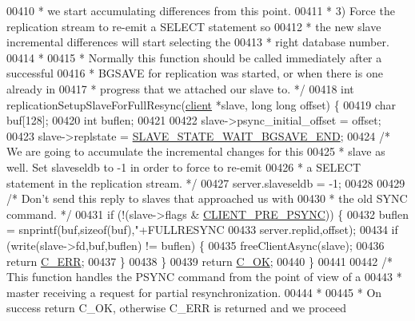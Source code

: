 \begin{DoxyCode}
{{{{{{{{{{{{{{{{{{{00410 \textcolor{comment}{ *    we start accumulating differences from this point.}
00411 \textcolor{comment}{ * 3) Force the replication stream to re-emit a SELECT statement so}
00412 \textcolor{comment}{ *    the new slave incremental differences will start selecting the}
00413 \textcolor{comment}{ *    right database number.}
00414 \textcolor{comment}{ *}
00415 \textcolor{comment}{ * Normally this function should be called immediately after a successful}
00416 \textcolor{comment}{ * BGSAVE for replication was started, or when there is one already in}
00417 \textcolor{comment}{ * progress that we attached our slave to. */}
00418 \textcolor{keywordtype}{int} replicationSetupSlaveForFullResync(\hyperlink{structclient}{client} *slave, \textcolor{keywordtype}{long} \textcolor{keywordtype}{long} offset) \{
00419     \textcolor{keywordtype}{char} buf[128];
00420     \textcolor{keywordtype}{int} buflen;
00421 
00422     slave->psync\_initial\_offset = offset;
00423     slave->replstate = \hyperlink{server_8h_a2a1b586e8f326f831f6ab466c8c3f38a}{SLAVE\_STATE\_WAIT\_BGSAVE\_END};
00424     \textcolor{comment}{/* We are going to accumulate the incremental changes for this}
00425 \textcolor{comment}{     * slave as well. Set slaveseldb to -1 in order to force to re-emit}
00426 \textcolor{comment}{     * a SELECT statement in the replication stream. */}
00427     server.slaveseldb = -1;
00428 
00429     \textcolor{comment}{/* Don't send this reply to slaves that approached us with}
00430 \textcolor{comment}{     * the old SYNC command. */}
00431     \textcolor{keywordflow}{if} (!(slave->flags & \hyperlink{server_8h_ac13d62411270bd658f6d82e711e0f912}{CLIENT\_PRE\_PSYNC})) \{
00432         buflen = snprintf(buf,\textcolor{keyword}{sizeof}(buf),\textcolor{stringliteral}{"+FULLRESYNC %
00433                           server.replid,offset);
00434         \textcolor{keywordflow}{if} (write(slave->fd,buf,buflen) != buflen) \{
00435             freeClientAsync(slave);
00436             \textcolor{keywordflow}{return} \hyperlink{server_8h_af98ac28d5f4d23d7ed5985188e6fb7d1}{C\_ERR};
00437         \}
00438     \}
00439     \textcolor{keywordflow}{return} \hyperlink{server_8h_a303769ef1065076e68731584e758d3e1}{C\_OK};
00440 \}
00441 
00442 \textcolor{comment}{/* This function handles the PSYNC command from the point of view of a}
00443 \textcolor{comment}{ * master receiving a request for partial resynchronization.}
00444 \textcolor{comment}{ *}
00445 \textcolor{comment}{ * On success return C\_OK, otherwise C\_ERR is returned and we proceed}
}}}}}}}}}}}}}}}}}}}}
\end{DoxyCode}
